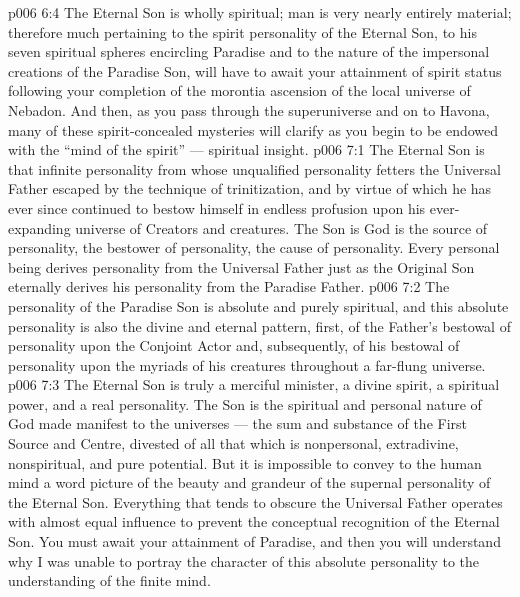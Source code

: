 \vs p006 6:4 The Eternal Son is wholly spiritual; man is very nearly entirely material; therefore much pertaining to the spirit personality of the Eternal Son, to his seven spiritual spheres encircling Paradise and to the nature of the impersonal creations of the Paradise Son, will have to await your attainment of spirit status following your completion of the morontia ascension of the local universe of Nebadon. And then, as you pass through the superuniverse and on to Havona, many of these spirit\hyp{}concealed mysteries will clarify as you begin to be endowed with the “mind of the spirit” --- spiritual insight.
\vs p006 7:1 The Eternal Son is that infinite personality from whose unqualified personality fetters the Universal Father escaped by the technique of trinitization, and by virtue of which he has ever since continued to bestow himself in endless profusion upon his ever\hyp{}expanding universe of Creators and creatures. The Son is  God is  the source of personality, the bestower of personality, the cause of personality. Every personal being derives personality from the Universal Father just as the Original Son eternally derives his personality from the Paradise Father.
\vs p006 7:2 The personality of the Paradise Son is absolute and purely spiritual, and this absolute personality is also the divine and eternal pattern, first, of the Father’s bestowal of personality upon the Conjoint Actor and, subsequently, of his bestowal of personality upon the myriads of his creatures throughout a far\hyp{}flung universe.
\vs p006 7:3 The Eternal Son is truly a merciful minister, a divine spirit, a spiritual power, and a real personality. The Son is the spiritual and personal nature of God made manifest to the universes --- the sum and substance of the First Source and Centre, divested of all that which is nonpersonal, extradivine, nonspiritual, and pure potential. But it is impossible to convey to the human mind a word picture of the beauty and grandeur of the supernal personality of the Eternal Son. Everything that tends to obscure the Universal Father operates with almost equal influence to prevent the conceptual recognition of the Eternal Son. You must await your attainment of Paradise, and then you will understand why I was unable to portray the character of this absolute personality to the understanding of the finite mind.
